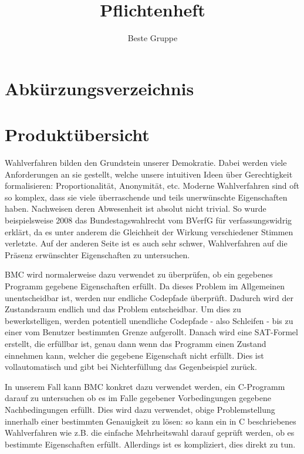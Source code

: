 \documentclass[a4paper]{scrreprt}
\begin{document}
\title{Pflichtenheft}
\author{Beste Gruppe}
\maketitle
 

\tableofcontents	

\listoffigures

\chapter*{Abkürzungsverzeichnis}
\begin{acronym} %
\end{acronym}
 
\chapter{Produktübersicht}
Wahlverfahren bilden den Grundstein unserer Demokratie. Dabei werden viele Anforderungen an sie gestellt, welche unsere intuitiven Ideen über Gerechtigkeit formalisieren: Proportionalität, Anonymität, etc. Moderne Wahlverfahren sind oft so komplex, dass sie viele überraschende und teils unerwünschte Eigenschaften haben. Nachweisen deren Abwesenheit ist absolut nicht trivial. So wurde beispielsweise 2008 das Bundestagswahlrecht vom BVerfG für verfassungswidrig erklärt, da es unter anderem die Gleichheit der Wirkung verschiedener Stimmen verletzte. Auf der anderen Seite ist es auch sehr schwer, Wahlverfahren auf die Präsenz erwünschter Eigenschaften zu untersuchen.

\ac{BMC} wird normalerweise dazu verwendet zu überprüfen, ob ein gegebenes Programm gegebene Eigenschaften erfüllt. Da dieses Problem im Allgemeinen unentscheidbar ist, werden nur endliche Codepfade überprüft. Dadurch wird der Zustandsraum endlich und das Problem entscheidbar. Um dies zu bewerkstelligen, werden potentiell unendliche Codepfade - also Schleifen - bis zu einer vom Benutzer bestimmten Grenze aufgerollt. Danach wird eine SAT-Formel erstellt, die erfüllbar ist, genau dann wenn das Programm einen Zustand einnehmen kann, welcher die gegebene Eigenschaft nicht erfüllt. Dies ist vollautomatisch und gibt bei Nichterfüllung das Gegenbeispiel zurück.  

In unserem Fall kann \ac{BMC} konkret dazu verwendet werden, ein C-Programm darauf zu untersuchen ob es im Falle gegebener Vorbedingungen gegebene Nachbedingungen erfüllt. Dies wird dazu verwendet, obige Problemstellung innerhalb einer bestimmten Genauigkeit zu lösen: so kann ein in C beschriebenes Wahlverfahren wie z.B. die einfache Mehrheitswahl darauf geprüft werden, ob es bestimmte Eigenschaften erfüllt. Allerdings ist es kompliziert, dies direkt zu tun. 
\end{document}
